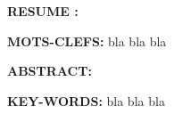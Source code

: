 


\pagestyle{empty}

\AddToShipoutPicture*{\BackgroundPicLastPage}

\vspace{1.5cm}


\begin{center}{\LARGE \textbf{\myTitle}}\\
\vspace{.4cm}
{\large \textbf{\myName}}\\
\end{center}

\vspace{.9cm}

\textbf{RESUME :}


\vspace{.6cm}

\textbf{MOTS-CLEFS:}  bla bla bla 

\vspace{1.0cm}

\textbf{ABSTRACT:} 


\vspace{.6cm}
\textbf{KEY-WORDS: } bla bla bla

\restoregeometry
